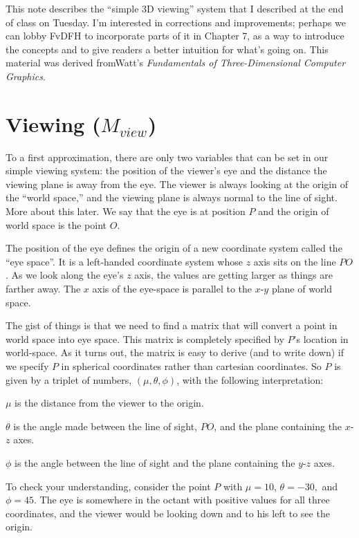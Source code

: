 


%

\noindent This note describes the ``simple 3D viewing'' system that 
I described at the end of class on Tuesday. I'm interested in corrections and
improvements; perhaps we can lobby FvDFH to incorporate parts of it in Chapter
7, as a way to introduce the concepts and to give readers a better intuition
for what's going on. This material was derived fromWatt's {\it Fundamentals of
Three-Dimensional Computer Graphics}.


\section{ Viewing ($M_{view}$)}

To a first approximation, there are only two variables that can be set in our
simple viewing system: the position of the viewer's eye and the distance the
viewing plane is away from the eye. The viewer is always looking at the origin
of the ``world space,'' and the viewing plane is always normal to the line of
sight. More about this later.  We say that the eye is at position $P$ and the
origin of world space is the point $O$.

The position of the eye defines the origin of a new coordinate system called
the ``eye space''. It is a left-handed coordinate system whose $z$ axis sits on
the line $PO$. As we look along the eye's $z$ axis, the values are getting
larger as things are farther away. The $x$ axis of the eye-space is parallel to
the $x$-$y$ plane of world space.

The gist of things is that we need to find a matrix that will convert a point
in world space into eye space. This matrix is completely specified by $P$'s
location in world-space. As it turns out, the matrix is easy to derive (and to
write down) if we specify $P$ in spherical coordinates rather than cartesian
coordinates. So $P$ is given by a triplet of numbers, $(\mu, \theta, \phi)$,
with the following interpretation: \begin{description} \item $\mu$ is the
distance from the viewer to the origin. \item $\theta$ is the angle made
between the line of sight, $PO$, and the plane containing the $x$-$z$ axes.
\item $\phi$ is the angle between the line of sight and the plane containing
the $y$-$z$ axes. \end{description} To check your understanding, consider the
point $P$ with $\mu=10$, $\theta=-30,$ and $\phi=45$. The eye is somewhere in
the octant with positive values for all three coordinates, and the viewer would
be looking down and to his left to see the origin.

